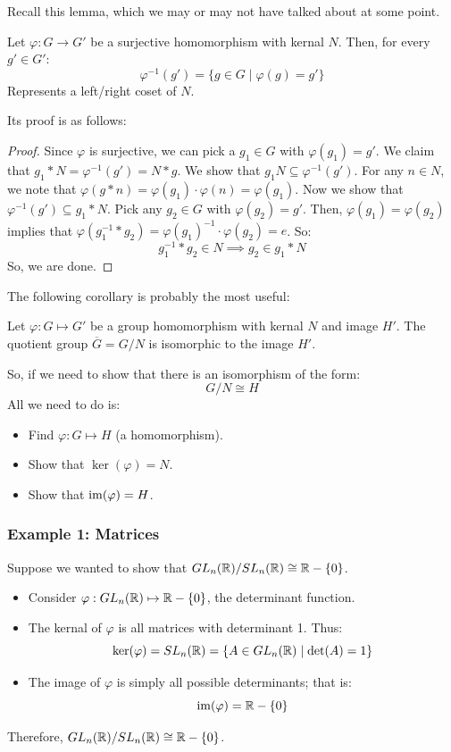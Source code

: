 \documentclass[letterpaper]{article}
\begin{document}
Recall this lemma, which we may or may not have talked about at some point. 
\begin{lemma}{}{}
    Let $\varphi: G \to G'$ be a surjective homomorphism with kernal $N$. Then, for every $g' \in G'$: 
    \[\varphi^{-1}(g') = \{g \in G \mid \varphi(g) = g'\}\]
    Represents a left/right coset of $N$. 
\end{lemma}
Its proof is as follows: 
\begin{mdframed}
    \begin{proof}
        Since $\varphi$ is surjective, we can pick a $g_1 \in G$ with $\varphi(g_1) = g'$. We claim that $g_1 * N = \varphi^{-1}(g') = N * g$. We show that $g_1 N \subseteq \varphi^{-1}(g')$. For any $n \in N$, we note that $\varphi(g * n) = \varphi(g_1) \cdot \varphi(n) = \varphi(g_1)$. Now we show that $\varphi^{-1}(g') \subseteq g_1 * N$. Pick any $g_2 \in G$ with $\varphi(g_2) = g'$. Then, $\varphi(g_1) = \varphi(g_2)$ implies that $\varphi(g_{1}^{-1} * g_2) = \varphi(g_1)^{-1} \cdot \varphi(g_2) = e$. So:
        \[g_{1}^{-1} * g_2 \in N \implies g_2 \in g_1 * N\]
        So, we are done.  
    \end{proof}
\end{mdframed}

The following corollary is probably the most useful:
\begin{corollary}{}{}
    Let $\varphi: G \mapsto G'$ be a group homomorphism with kernal $N$ and image $H'$. The quotient group $\overline{G} = G / N$ is isomorphic to the image $H'$. 
\end{corollary}

So, if we need to show that there is an isomorphism of the form: 
\[G / N \cong H\]
All we need to do is: 
\begin{itemize}
    \item Find $\varphi: G \mapsto H$ (a homomorphism). 
    \item Show that $\ker(\varphi) = N$. 
    \item Show that $\operatorname{im}(\varphi) = H$. 
\end{itemize}

\subsubsection{Example 1: Matrices}
Suppose we wanted to show that $GL_{n}(\mathbb{R}) / SL_{n}(\mathbb{R}) \cong \mathbb{R} - \{0\}$. 
\begin{itemize}
    \item Consider $\varphi: GL_{n}(\mathbb{R}) \mapsto \mathbb{R} - \{0\}$, the determinant function.
    \item The kernal of $\varphi$ is all matrices with determinant 1. Thus: 
    \[\ker(\varphi) = SL_{n}(\mathbb{R}) = \{A \in GL_{n}(\mathbb{R}) \mid \det(A) = 1\}\]
    \item The image of $\varphi$ is simply all possible determinants; that is: 
    \[\operatorname{im}(\varphi) = \mathbb{R} - \{0\}\]
\end{itemize}
Therefore, $GL_{n}(\mathbb{R}) / SL_{n}(\mathbb{R}) \cong \mathbb{R} - \{0\}$. 
\end{document}
